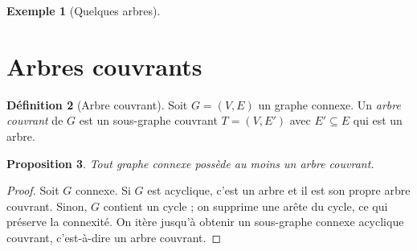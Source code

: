 \documentclass[12pt,a4paper,openany]{book}
\theoremstyle{definition}
\newtheorem{definition}{Définition}[chapter]
\newtheorem{exemple}[definition]{Exemple}
\theoremstyle{plain}
\newtheorem{proposition}[definition]{Proposition}
\theoremstyle{remark}
\begin{document}
\begin{exemple}[Quelques arbres]
\label{ex:arbres-petits}

\begin{center}
\end{center}
\end{exemple}

\section{Arbres couvrants}
\label{sec:arbres-couvrants}

\begin{definition}[Arbre couvrant]
\label{def:arbre-couvrant}
Soit $G=(V,E)$ un graphe connexe. Un \emph{arbre couvrant} de $G$ est un
sous-graphe couvrant $T=(V,E')$ avec $E' \subseteq E$ qui est un arbre.
\end{definition}

\begin{proposition}
Tout graphe connexe possède au moins un arbre couvrant.
\end{proposition}

\begin{proof}
Soit $G$ connexe. Si $G$ est acyclique, c'est un arbre et il est son
propre arbre couvrant. Sinon, $G$ contient un cycle ; on supprime une
arête du cycle, ce qui préserve la connexité. On itère jusqu'à obtenir
un sous-graphe connexe acyclique couvrant, c'est-à-dire un arbre
couvrant.
\end{proof}
\end{document}
